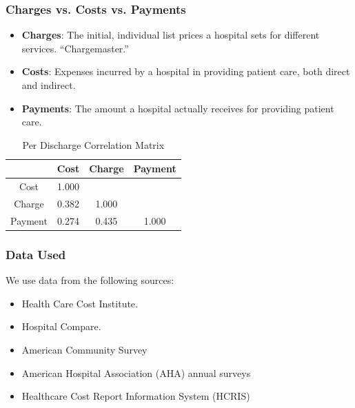 \documentclass[ucs,9pt]{beamer}
\begin{document}
\begin{frame}
\frametitle{Charges vs. Costs vs. Payments }
\begin{itemize}
\item \textbf{Charges}: The initial, individual list prices a hospital sets for different services. ``Chargemaster.''  
\item \textbf{Costs}: Expenses incurred by a hospital in providing patient care, both direct and indirect.
\item \textbf{Payments}: The amount a hospital actually receives for providing patient care.
\end{itemize}
\begin{table}[htp]
\centering \normalsize
\caption{Per Discharge Correlation Matrix}
\label{tab:corr}

\begin{tabular}{c|ccc}
 		& Cost & Charge & Payment \\
 		\hline
Cost &	1.000		&& \\
Charge &0.382 & 1.000& \\
Payment &0.274&0.435 & 1.000\\
\hline
\end{tabular}
\end{table}
\end{frame}

\begin{frame}
\frametitle{Data Used}
We use data from the following sources:
\begin{itemize}
\item Health Care Cost Institute.
\item Hospital Compare.
\item American Community Survey
\item American Hospital Association (AHA) annual surveys
\item Healthcare Cost Report Information System (HCRIS) 
\end{itemize}
\end{frame}
\end{document}
